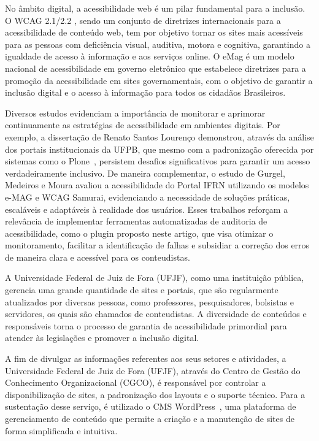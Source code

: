\documentclass[
    12pt,
    a4paper,
    oneside,
    brazil,
    english
]{article}
\begin{document}
No âmbito digital, a acessibilidade web é um pilar fundamental para a
inclusão. O WCAG 2.1/2.2 \cite{wcag22}, sendo um conjunto de diretrizes
internacionais para a acessibilidade de conteúdo web, tem por objetivo
tornar os sites mais acessíveis para as pessoas com deficiência visual, auditiva,
motora e cognitiva, garantindo a igualdade de acesso à informação e aos
serviços online. O eMag é um modelo nacional de acessibilidade em governo
eletrônico que estabelece diretrizes para a promoção da acessibilidade em
sites governamentais, com o objetivo de garantir a inclusão digital e o acesso
à informação para todos os cidadãos Brasileiros.

Diversos estudos evidenciam a importância de monitorar e aprimorar continuamente
as estratégias de acessibilidade em ambientes digitais. Por exemplo, a dissertação de Renato
Santos Lourenço \cite{PhdRenato} demonstrou, através da análise dos portais institucionais
da UFPB, que mesmo com a padronização oferecida por sistemas como o Plone~\cite{plone},
persistem desafios significativos para garantir um acesso verdadeiramente inclusivo.
De maneira complementar, o estudo de Gurgel, Medeiros e Moura \cite{Gurgel}
avaliou a acessibilidade do Portal IFRN utilizando os modelos e-MAG e
WCAG Samurai, evidenciando a necessidade de soluções práticas, escaláveis e adaptáveis à
realidade dos usuários. Esses trabalhos reforçam a relevância de implementar ferramentas automatizadas de auditoria de acessibilidade, como o plugin proposto neste artigo, que visa
otimizar o monitoramento, facilitar a identificação de falhas e subsidiar a correção dos erros de
maneira clara e acessível para os conteudistas.

A Universidade Federal de Juiz de Fora (UFJF), como uma instituição pública,
gerencia uma grande quantidade de sites e portais, que são regularmente
atualizados por diversas pessoas, como professores, pesquisadores, bolsistas e
servidores, os quais são chamados de conteudistas. A diversidade de conteúdos e
responsáveis torna o processo de garantia de acessibilidade primordial para
atender às legislações e promover a inclusão digital.

A fim de divulgar as informações referentes aos seus setores e atividades, a
Universidade Federal de Juiz de Fora (UFJF), através do Centro de Gestão
do Conhecimento Organizacional (CGCO), é responsável por controlar a
disponibilização de sites, a padronização dos layouts e o suporte técnico. Para
a sustentação desse serviço, é utilizado o CMS WordPress~\cite{WP},
uma plataforma de gerenciamento de conteúdo que permite a criação e a
manutenção de sites de forma simplificada e intuitiva.
\end{document}
